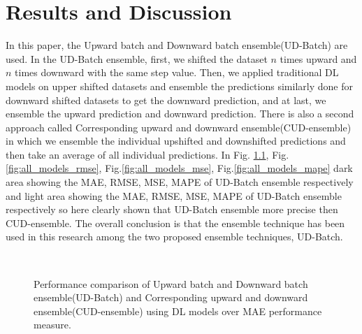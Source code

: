 
\chapter{Results and Discussion} %

\label{c5} %


In this paper, the Upward batch and Downward batch ensemble(UD-Batch) are used. In the UD-Batch ensemble, first, we shifted the dataset $n$ times upward and $n$ times downward with the same step value. Then, we applied traditional DL models on upper shifted datasets and ensemble the predictions similarly done for downward shifted datasets to get the downward prediction, and at last, we ensemble the upward prediction and downward prediction. There is also a second approach called Corresponding upward and downward ensemble(CUD-ensemble) in which we ensemble the individual upshifted and downshifted predictions and then take an average of all individual predictions. In Fig. \ref{fig:all_models_mae}, Fig.\ref{fig:all_models_rmse}, Fig.\ref{fig:all_models_mse}, Fig.\ref{fig:all_models_mape} dark area showing the MAE, RMSE, MSE, MAPE of UD-Batch ensemble respectively and light area showing the MAE, RMSE, MSE, MAPE of UD-Batch ensemble respectively so here clearly shown that UD-Batch ensemble more precise then CUD-ensemble. The overall conclusion is that the ensemble technique has been used in this research among the two proposed ensemble techniques, UD-Batch.
\begin{figure}[ht!]
{}
\hfill
{}\\
\hfill
{}
\caption{Performance comparison of Upward batch and Downward batch ensemble(UD-Batch) and Corresponding upward and downward ensemble(CUD-ensemble) using DL models over MAE performance measure.}
\label{fig:all_models_mae}
\end{figure}

